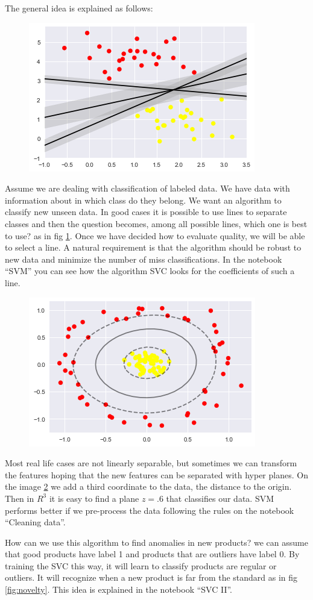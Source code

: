 \documentclass[11pt,letterpaper]{report}
\begin{document}
	The general idea is explained as follows:
	\begin{figure}[h!]
		\centering
		\includegraphics[width=0.45\linewidth]{figures/svcl.png}
		\caption{}
		\label{fig:lines}
	\end{figure} 
	
	Assume we are dealing with classification of labeled data. We have data with information about in which class do they belong. We want an algorithm to classify new unseen data. In good cases it is possible to use lines to separate classes and then the question becomes, among all possible lines, which one is best to use? as in fig \ref{fig:lines}. Once we have decided how to evaluate quality, we will be able to select a line. A natural requirement is that the algorithm should be robust to new data and minimize the number of miss classifications. In the notebook ``SVM'' you can see how the algorithm SVC looks for  the coefficients of such a line.

\begin{figure}[h!]
	\centering
	\includegraphics[width=0.45\linewidth]{figures/svc.png}
	\caption{}
	\label{fig:kernel}
\end{figure} 
	
 Most real life cases are not linearly separable, but sometimes we can transform the features hoping that the new features can be separated  with hyper planes. On the image \ref{fig:kernel} we add a third coordinate to the data, the distance to the origin. Then in $R^3$ it is easy to find a plane $z=.6$ that classifies our data. SVM performs better if we pre-process the data following the rules on the notebook ``Cleaning data''. 
 
How can we use this algorithm to find anomalies in new products? we can assume that good products have label 1 and products that are outliers have label 0. By training the SVC this way, it will learn to classify products are regular or outliers. It will recognize when a new product is far from the standard as in fig \ref{fig:novelty}. This idea is explained in the notebook ``SVC II''. 
	
\end{document}
